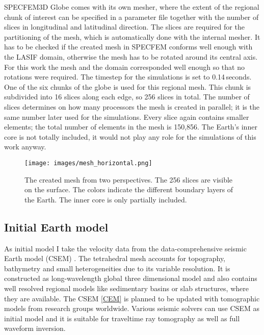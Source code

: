 SPECFEM3D Globe comes with its own mesher, where the extent of the regional chunk of interest can be 
specified in a parameter file together with the number of slices in longitudinal and latitudinal direction.
The slices are required for the partitioning of the mesh, which is automatically done with the internal mesher.
It has to be checked if the created mesh in SPECFEM conforms well enough with the LASIF domain, 
otherwise the mesh has to be rotated around its central axis.
For this work the mesh and the domain corresponded well enough so that no rotations were required.
The timestep for the simulations is set to 0.14$\,$seconds.  
One of the six chunks of the globe is used for this regional mesh.
This chunk is subdivided into 16 slices along each edge, so 256 slices in total.
The number of slices determines on how many processors the mesh is created in parallel; 
it is the same number later used for the simulations. 
Every slice again contains smaller elements; the total number of elements in the mesh 
is 150,856. The Earth's inner core is not totally included, it would not play any role
for the simulations of this work anyway.

\begin{figure}[h]
\begin{center}
\texttt{[image: images/mesh\_horizontal.png]}
\caption[Overview of the mesh.]{The created mesh from two perspectives. The 256 slices are visible on the surface.
The colors indicate the different boundary layers of the Earth. The inner core is only partially
included. }
\label{mesh}
\end{center}
\end{figure}


\subsection{Initial Earth model}

As initial model I take the velocity data from the data-comprehensive seismic Earth model (CSEM) \citep{Afanasiev2014}.
The tetrahedral mesh accounts for topography, bathymetry and small heterogeneities due to its variable resolution.
It is constructed as long-wavelength global three dimensional model and also contains well resolved regional models
like sedimentary basins or slab structures, where they are available.
The CSEM \autoref{CEM} is planned to be updated with tomographic models from research groups worldwide.
Various seismic solvers can use CSEM as initial model and it is suitable for traveltime ray tomography as well as
full waveform inversion.

